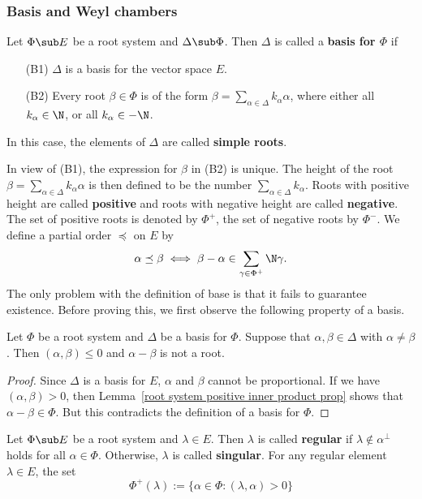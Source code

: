 \subsubsection{Basis and Weyl chambers}
\begin{definition}
Let $\Phi\sub E$ be a root system and $\Delta\sub\Phi$. Then $\Delta$ is called a \textbf{basis for $\Phi$} if
\begin{itemize}
\item[(B1)] $\Delta$ is a basis for the vector space $E$.
\item[(B2)] Every root $\beta\in\Phi$ is of the form $\beta=\sum_{\alpha\in\Delta}k_\alpha\alpha$, where either all $k_\alpha\in\N$, or all $k_\alpha\in-\N$.
\end{itemize}
In this case, the elements of $\Delta$ are called \textbf{simple roots}. 
\end{definition}
In view of (B1), the expression for $\beta$ in (B2) is unique. The height of the root $\beta=\sum_{\alpha\in\Delta}k_\alpha\alpha$ is then defined to be the number $\sum_{\alpha\in\Delta}k_\alpha$. Roots with positive height are called \textbf{positive} and roots with negative height are called \textbf{negative}. The set of positive roots is denoted by $\Phi^+$, the set of negative roots by $\Phi^-$. We define a partial order $\preceq$ on $E$ by
\[\alpha\preceq\beta\iff\beta-\alpha\in\sum_{\gamma\in\Phi^+}\N\gamma.\]
The only problem with the definition of base is that it fails to guarantee existence. Before proving this, we first observe the following property of a basis.
\begin{lemma}\label{root system basis negative inner product}
Let $\Phi$ be a root system and $\Delta$ be a basis for $\Phi$. Suppose that $\alpha,\beta\in\Delta$ with $\alpha\neq\beta$. Then $(\alpha,\beta)\leq 0$ and $\alpha-\beta$ is not a root.
\end{lemma}
\begin{proof}
Since $\Delta$ is a basis for $E$, $\alpha$ and $\beta$ cannot be proportional. If we have $(\alpha,\beta)>0$, then Lemma~\ref{root system positive inner product prop} shows that $\alpha-\beta\in\Phi$. But this contradicts the definition of a basis for $\Phi$.
\end{proof}
Let $\Phi\sub E$ be a root system and $\lambda\in E$. Then $\lambda$ is called \textbf{regular} if $\lambda\notin\alpha^\bot$ holds for all $\alpha\in\Phi$. Otherwise, $\lambda$ is called \textbf{singular}. For any regular element $\lambda\in E$, the set
\[\Phi^+(\lambda):=\{\alpha\in\Phi:(\lambda,\alpha)>0\}\]
